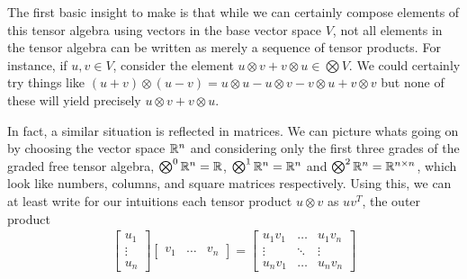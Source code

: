 \documentclass[11pt]{article}
\begin{document}
The first basic insight to make is that while we can certainly compose elements of this tensor algebra using vectors in the base vector space $V$, not all elements in the tensor algebra can be written as merely a sequence of tensor products. For instance, if $u,v \in V$, consider the element $u \otimes v + v \otimes u \in \bigotimes V$. We could certainly try things like $(u + v) \otimes (u - v) = u \otimes u - u \otimes v - v\otimes u + v \otimes v$ but none of these will yield precisely $u \otimes v + v \otimes u$.

In fact, a similar situation is reflected in matrices. We can picture whats going on by choosing the vector space $\mathbb{R}^n$ and considering only the first three grades of the graded free tensor algebra, $\bigotimes^0 \mathbb{R}^n = \mathbb{R}$, $\bigotimes^1 \mathbb{R}^n = \mathbb{R}^n$ and $\bigotimes^2 \mathbb{R}^n = \mathbb{R}^{n \times n}$, which look like numbers, columns, and square matrices respectively. Using this, we can at least write for our intuitions each tensor product $u \otimes v$ as $u v^T$, the outer product \begin{gather*}
\begin{bmatrix} u_1 \\ \vdots \\ u_n \end{bmatrix} \begin{bmatrix} v_1 & \dots & v_n \end{bmatrix} = \begin{bmatrix} u_1 v_1 & \dots & u_1 v_n \\ \vdots & \ddots & \vdots \\ u_n v_1 & \dots & u_n v_n \end{bmatrix}
\end{gather*}
\end{document}
